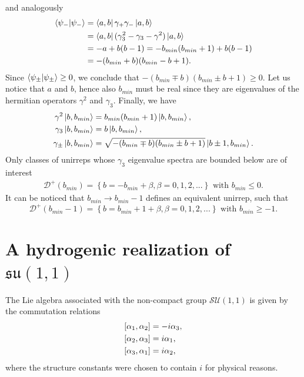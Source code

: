 \documentclass[12pt,a4paper]{report}
\theoremstyle{definition}
\theoremstyle{remark}
\theoremstyle{remark}
\begin{document}
and analogously
\begin{align*}
\braket{\psi_-|\psi_-}&=\bra{a,b}\gamma_+\gamma_-\ket{a,b}\\
&=\bra{a,b}(\gamma_3^2-\gamma_3-\gamma^2)\ket{a,b} \\
&=-a+b(b-1)=-b_{min}(b_{min}+1)+b(b-1)\\
&=-(b_{min}+b)(b_{min}-b+1).
\end{align*}
Since $\braket{\psi_\pm|\psi_\pm}\geq 0$, we conclude that $-(b_{min}\mp b)(b_{min}\pm b+1)\geq 0$. Let us notice that $a$ and $b$, hence also $b_{min}$ must be real since they are eigenvalues of the hermitian operators $\gamma^2$ and $\gamma_3$. Finally, we have
\begin{equation}\label{eladder4}
\begin{aligned}
\gamma^2\ket{b,b_{min}}&=b_{min}(b_{min}+1)\ket{b,b_{min}},\\
\gamma_3\ket{b,b_{min}}&=b\ket{b,b_{min}},\\
\gamma_\pm\ket{b,b_{min}}&=\sqrt{-(b_{min}\mp b)(b_{min}\pm b+1)}\ket{b\pm 1,b_{min}}.
\end{aligned}
\end{equation}
Only classes of unirreps whose $\gamma_3$ eigenvalue spectra are bounded below are of interest
\begin{align*}
\mathcal{D}^+(b_{min})=\left\lbrace b=-b_{min}+\beta,\beta=0,1,2,...\right\rbrace \text{ with }b_{min}\leq 0.
\end{align*}
It can be noticed that $b_{min}\rightarrow b_{min}-1$ defines an equivalent unirrep, such that
\begin{equation}\label{eladder5}
\mathcal{D}^+(b_{min}-1)=\left\lbrace b=b_{min}+1+\beta,\beta=0,1,2,...\right\rbrace \text{ with }b_{min}\geq -1.
\end{equation}

\section{A hydrogenic realization of $\mathfrak{su}(1,1)$}
The Lie algebra associated with the non-compact group $\mathcal{SU}(1,1)$ is given by the commutation relations
\begin{equation}\label{esu11.1}
\begin{aligned} \relax
[\alpha_1,\alpha_2]&=-i\alpha_3, \\
[\alpha_2,\alpha_3]&=i\alpha_1, \\
[\alpha_3,\alpha_1]&=i\alpha_2,
\end{aligned}
\end{equation}
where the structure constants were chosen to contain $i$ for physical reasons.
\end{document}
